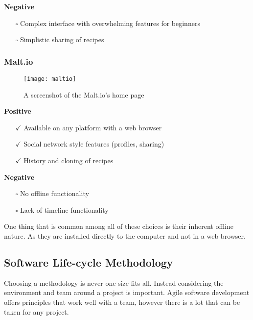 \noindent\textbf{Negative}

\begin{itemize}
  \item[$\square$] Complex interface with overwhelming features for beginners
  \item[$\square$] Simplistic sharing of recipes
\end{itemize}

\subsubsection{Malt.io}

\begin{figure}[H]
  \centering
    \texttt{[image: maltio]}
  \caption{A screenshot of the Malt.io's home page}
  \label{figure-maltio}
\end{figure}

\noindent\textbf{Positive}

\begin{itemize}
  \item[$\checkmark$] Available on any platform with a web browser
  \item[$\checkmark$] Social network style features (profiles, sharing)
  \item[$\checkmark$] History and cloning of recipes
\end{itemize}

\noindent\textbf{Negative}

\begin{itemize}
  \item[$\square$] No offline functionality
  \item[$\square$] Lack of timeline functionality
\end{itemize}

One thing that is common among all of these choices is their inherent offline nature. As they are installed directly to the computer and not in a web browser.

\subsection{Software Life-cycle Methodology} \label{a-d--methodology--life-cycle}

Choosing a methodology is never one size fits all. Instead considering the environment and team around a project is important. Agile software development offers principles that work well with a team, however there is a lot that can be taken for any project.

